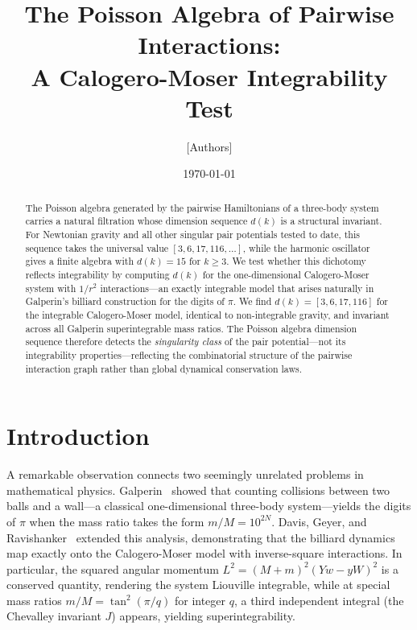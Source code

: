 \documentclass[aps,prl,twocolumn,superscriptaddress,showpacs]{revtex4-2}
\begin{document}
\title{The Poisson Algebra of Pairwise Interactions:\\
A Calogero-Moser Integrability Test}

\author{[Authors]}
\affiliation{[Institution]}

\date{\today}

\begin{abstract}
The Poisson algebra generated by the pairwise Hamiltonians of a
three-body system carries a natural filtration whose dimension sequence
$d(k)$ is a structural invariant.  For Newtonian gravity and all other
singular pair potentials tested to date, this sequence takes the
universal value $[3, 6, 17, 116, \ldots]$, while the harmonic
oscillator gives a finite algebra with $d(k) = 15$ for $k \geq 3$.
We test whether this dichotomy reflects integrability by computing
$d(k)$ for the one-dimensional Calogero-Moser system with $1/r^2$
interactions---an exactly integrable model that arises naturally in
Galperin's billiard construction for the digits of $\pi$.  We find
$d(k) = [3, 6, 17, 116]$ for the integrable Calogero-Moser model,
identical to non-integrable gravity, and invariant across all Galperin
superintegrable mass ratios.  The Poisson algebra dimension sequence
therefore detects the \emph{singularity class} of the pair
potential---not its integrability properties---reflecting the
combinatorial structure of the pairwise interaction graph rather than
global dynamical conservation laws.
\end{abstract}

\maketitle


\section{Introduction}
\label{sec:intro}

A remarkable observation connects two seemingly unrelated problems in
mathematical physics.  Galperin~\cite{Galperin2003} showed that
counting collisions between two balls and a wall---a classical
one-dimensional three-body system---yields the digits of $\pi$ when the
mass ratio takes the form $m/M = 10^{2N}$.  Davis, Geyer, and
Ravishanker~\cite{Davis2017} extended this analysis, demonstrating that
the billiard dynamics map exactly onto the Calogero-Moser model with
inverse-square interactions.  In particular, the squared angular
momentum $L^2 = (M+m)^2(Yw - yW)^2$ is a conserved quantity, rendering
the system Liouville integrable, while at special mass ratios
$m/M = \tan^2(\pi/q)$ for integer $q$, a third independent integral
(the Chevalley invariant $J$) appears, yielding superintegrability.
\end{document}
